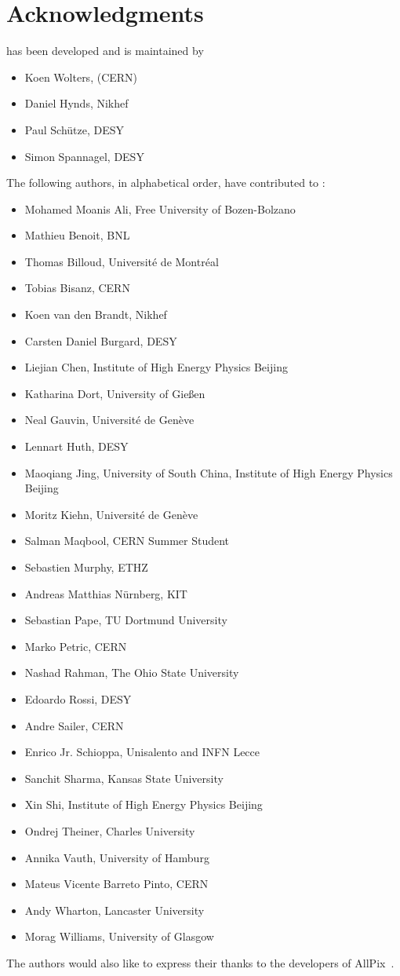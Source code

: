 \chapter{Acknowledgments}

\apsq has been developed and is maintained by

\begin{itemize}
\item Koen Wolters, (CERN)
\item Daniel Hynds, Nikhef
\item Paul Schütze, DESY
\item Simon Spannagel, DESY
\end{itemize}

The following authors, in alphabetical order, have contributed to \apsq:

\begin{itemize}
\item Mohamed Moanis Ali, Free University of Bozen-Bolzano
\item Mathieu Benoit, BNL
\item Thomas Billoud, Université de Montréal
\item Tobias Bisanz, CERN
\item Koen van den Brandt, Nikhef
\item Carsten Daniel Burgard, DESY
\item Liejian Chen, Institute of High Energy Physics Beijing
\item Katharina Dort, University of Gie\ss en
\item Neal Gauvin, Université de Genève
\item Lennart Huth, DESY
\item Maoqiang Jing, University of South China, Institute of High Energy Physics Beijing
\item Moritz Kiehn, Université de Genève
\item Salman Maqbool, CERN Summer Student
\item Sebastien Murphy, ETHZ
\item Andreas Matthias Nürnberg, KIT
\item Sebastian Pape, TU Dortmund University
\item Marko Petric, CERN
\item Nashad Rahman, The Ohio State University
\item Edoardo Rossi, DESY
\item Andre Sailer, CERN
\item Enrico Jr. Schioppa, Unisalento and INFN Lecce
\item Sanchit Sharma, Kansas State University
\item Xin Shi, Institute of High Energy Physics Beijing
\item Ondrej Theiner, Charles University
\item Annika Vauth, University of Hamburg
\item Mateus Vicente Barreto Pinto, CERN
\item Andy Wharton, Lancaster University
\item Morag Williams, University of Glasgow
\end{itemize}

The authors would also like to express their thanks to the developers of AllPix~\cite{ap1wiki,ap1git}.

